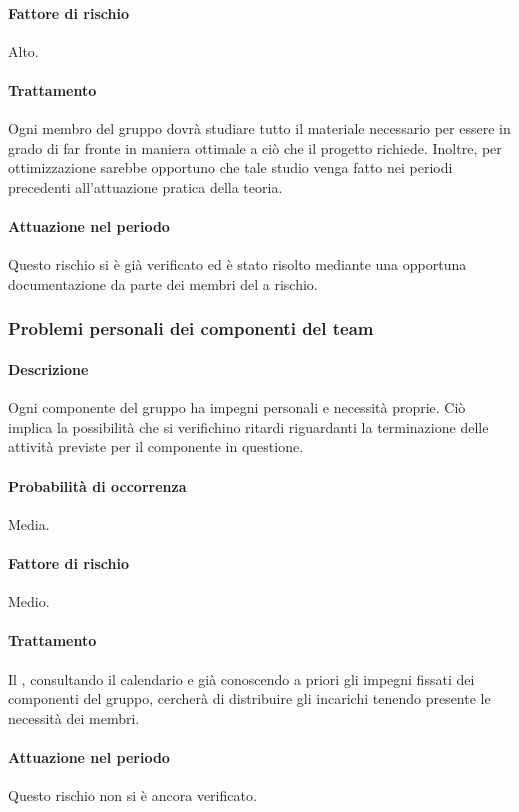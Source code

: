 \paragraph{Fattore di rischio}
Alto.
\paragraph{Trattamento}
Ogni membro del gruppo dovrà studiare tutto il materiale necessario per essere in grado di far fronte in maniera ottimale a ciò che il progetto richiede. Inoltre, per ottimizzazione sarebbe opportuno che tale studio venga fatto nei periodi precedenti all'attuazione pratica della teoria.
\paragraph{Attuazione nel periodo}
Questo rischio si è già verificato ed è stato risolto mediante una opportuna documentazione da parte dei membri del  a rischio.

\subsubsection{Problemi personali dei componenti del team}
\paragraph{Descrizione}
Ogni componente del gruppo ha impegni personali e necessità proprie. Ciò implica la possibilità che si verifichino ritardi riguardanti la terminazione delle attività previste per il componente in questione.
\paragraph{Probabilità di occorrenza}
Media.
\paragraph{Fattore di rischio}
Medio.
\paragraph{Trattamento}
Il \Pm, consultando il calendario e già conoscendo a priori gli impegni fissati dei componenti del gruppo, cercherà di distribuire gli incarichi tenendo presente le necessità dei membri.
\paragraph{Attuazione nel periodo}
Questo rischio non si è ancora verificato.

